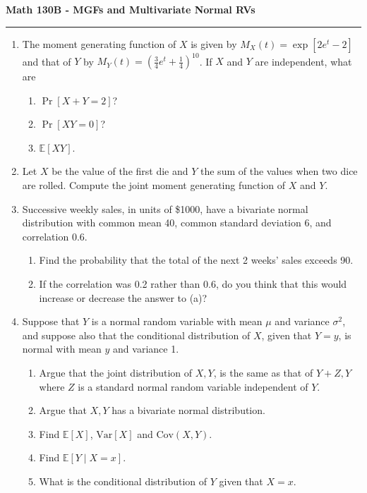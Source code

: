 \documentclass[11pt,letterpaper]{article}
\newcommand{\E}{\mathbb{E}}
\newcommand{\Var}{\text{Var}}
\newcommand{\Cov}{\text{Cov}}
\begin{document}
\begin{center}
{\bf \Large Math 130B - MGFs and Multivariate Normal RVs}
\vspace{0.2cm}
\hrule
\end{center}

\begin{enumerate}
	\item The moment generating function of $X$ is given by $M_X(t) = \exp[2e^t-2]$ and that of $Y$ by $M_Y(t) = (\frac{3}{4}e^t+\frac{1}{4})^{10}$. If $X$ and $Y$ are independent, what are
	\begin{enumerate}
		\item $\Pr[X+Y=2]$?
		\vfill
		\item $\Pr[XY = 0]$?
		\vfill
		\item $\E[XY]$.
	\end{enumerate}
	\vfill

	\item Let $X$ be the value of the first die and $Y$ the sum of the values when two dice are rolled. Compute the joint moment generating function of $X$ and $Y$.

	\vfill

	\item Successive weekly sales, in units of \$1000, have a bivariate normal distribution with common mean 40, common standard deviation 6, and correlation 0.6.
	\begin{enumerate}
		\item Find the probability that the total of the next 2 weeks' sales exceeds 90.
		\vfill

		\item If the correlation was 0.2 rather than 0.6, do you think that this would increase or decrease the answer to (a)?
	\end{enumerate}
	\vfill

	\item Suppose that $Y$ is a normal random variable with mean $\mu$ and variance $\sigma^2$, and suppose also that the conditional distribution of $X$, given that $Y=y$, is normal with mean $y$ and variance 1.
	\begin{enumerate}
		\item Argue that the joint distribution of $X,Y$, is the same as that of $Y+Z,Y$ where $Z$ is a standard normal random variable independent of $Y$.
		\vfill

		\item Argue that $X,Y$ has a bivariate normal distribution.

		\vfill

		\item Find $\E[X]$, $\Var[X]$ and $\Cov(X,Y)$.
		\vfill

		\item Find $\E[Y\mid X=x]$.
		\vfill

		\item What is the conditional distribution of $Y$ given that $X=x$.
	\end{enumerate}
	\vfill
\end{enumerate}
\end{document}
